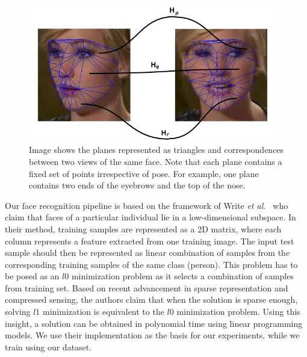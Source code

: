 \begin{figure}
\centering
\includegraphics[width =11cm,height=6cm]{front/figures/triangulation.png}
\caption{Image shows the planes represented as triangles and correspondences between two views of
the same face. Note that each plane contains a fixed set of points irrespective of pose. For
example, one plane contains two ends of the eyebrows and the top of the nose.}
\label{fig:triangulation}
\end{figure}

Our face recognition pipeline is based on the framework of Write {\em et
al.}~\cite{Wright:2009:RFR:1495801.1496037} who claim that faces of a
particular individual lie in a low-dimensional subspace. 
In their method, training samples are
represented as a 2D matrix, where each column represents a feature extracted from one training
image. The input test sample should then be represented as linear combination of samples from the
corresponding training samples of the same class (person). This problem has to be posed as an $l0$
minimization problem as it selects a combination of samples from training set. Based on recent advancement in sparse
representation and compressed sensing, the authors claim that when the solution is sparse enough, 
solving $l1$ minimization is equivalent to the $l0$ minimization problem. 
Using this insight, a solution can be obtained in polynomial time using linear programming models.
We use their implementation as the basis for our experiments, while we train using our dataset.
